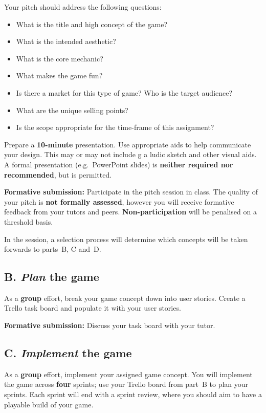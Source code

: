 \documentclass{../fal_assignment}
\begin{document}
Your pitch should address the following questions:
\begin{itemize}
	\item What is the title and high concept of the game?
	\item What is the intended aesthetic?
	\item What is the core mechanic? 
	\item What makes the game fun?
	\item Is there a market for this type of game? Who is the target audience?
	\item What are the unique selling points?
	\item Is the scope appropriate for the time-frame of this assignment?
\end{itemize}

Prepare a \textbf{10-minute} presentation.
Use appropriate aids to help communicate your design. This may or may not include g a ludic sketch 
and other visual aids. A formal presentation
(e.g.\ PowerPoint slides) is \textbf{neither required nor recommended}, but is permitted. 

\textbf{Formative submission:} Participate in the pitch session in class.
The quality of your pitch is \textbf{not formally assessed},
however you will receive formative feedback from your tutors and peers.
\textbf{Non-participation} will be penalised on a threshold basis.

In the session, a selection process will determine which concepts will be taken forwards to parts~B, C and~D.

\subsection*{B. \emph{Plan} the game}

As a \textbf{group} effort, break your game concept down into user stories.
Create a Trello task board and populate it with your user stories.

\textbf{Formative submission:} Discuss your task board with your tutor.

\subsection*{C. \emph{Implement} the game}

As a \textbf{group} effort, implement your assigned game concept.
You will implement the game across \textbf{four} sprints;
use your Trello board from part~B to plan your sprints.
Each sprint will end with a sprint review, where you should aim to have a playable build of your game.
\end{document}
